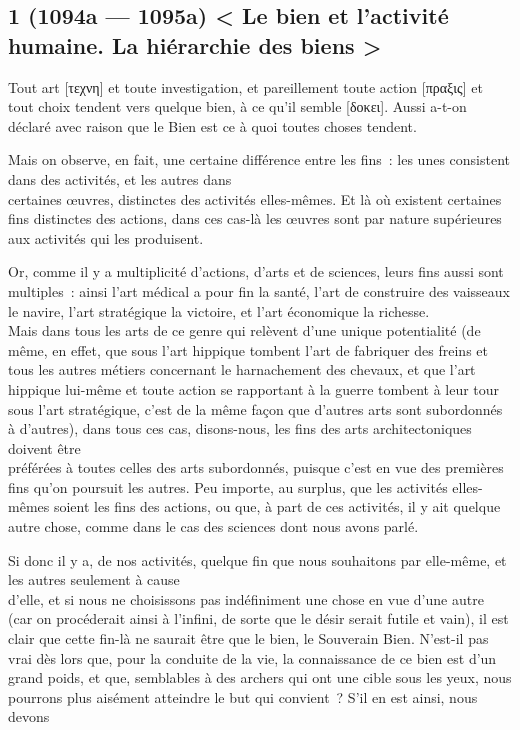 \documentclass[french,twoside]{book} %
\begin{document}
\subsection[{1 (1094a — 1095a) < Le bien et l’activité humaine. La hiérarchie des biens >}]{1 (1094a — 1095a) < Le bien et l’activité humaine. La hiérarchie des biens >}
\noindent  Tout art [τεχνη] et toute investigation, et pareillement toute action [πραξις] et tout choix tendent vers quelque bien, à ce qu’il semble [δοκει]. Aussi a-t-on déclaré avec raison que le Bien est ce à quoi toutes choses tendent.\par
Mais on observe, en fait, une certaine différence entre les fins : les unes consistent dans des activités, et les autres dans \\
certaines œuvres, distinctes des activités elles-mêmes. Et là où existent certaines fins distinctes des actions, dans ces cas-là les œuvres sont par nature supérieures aux activités qui les produisent.\par
Or, comme il y a multiplicité d’actions, d’arts et de sciences, leurs fins aussi sont multiples : ainsi l’art médical a pour fin la santé, l’art de construire des vaisseaux le navire, l’art stratégique la victoire, et l’art économique la richesse. \\
Mais dans tous les arts de ce genre qui relèvent d’une unique potentialité (de même, en effet, que sous l’art hippique tombent l’art de fabriquer des freins et tous les autres métiers concernant le harnachement des chevaux, et que l’art hippique lui-même et toute action se rapportant à la guerre tombent à leur tour sous l’art stratégique, c’est de la même façon que d’autres arts sont subordonnés à d’autres), dans tous ces cas, disons-nous, les fins des arts architectoniques doivent être \\
préférées à toutes celles des arts subordonnés, puisque c’est en vue des premières fins qu’on poursuit les autres. Peu importe, au surplus, que les activités elles-mêmes soient les fins des actions, ou que, à part de ces activités, il y ait quelque autre chose, comme dans le cas des sciences dont nous avons parlé.\par
Si donc il y a, de nos activités, quelque fin que nous souhaitons par elle-même, et les autres seulement à cause \\
d’elle, et si nous ne choisissons pas indéfiniment une chose en vue d’une autre (car on procéderait ainsi à l’infini, de sorte que le désir serait futile et vain), il est clair que cette fin-là ne saurait être que le bien, le Souverain Bien. N’est-il pas vrai dès lors que, pour la conduite de la vie, la connaissance de ce bien est d’un grand poids, et que, semblables à des archers qui ont une cible sous les yeux, nous pourrons plus aisément atteindre le but qui convient ? S’il en est ainsi, nous devons \\
\end{document}
